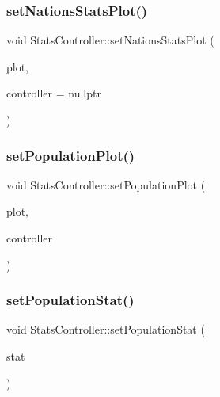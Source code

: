 \mbox{\label{class_stats_controller_ad58717c9b4d91e5c61039ad6fe9a03e8}} 
\subsubsection{\texorpdfstring{setNationsStatsPlot()}{setNationsStatsPlot()}}
{\footnotesize\ttfamily void Stats\+Controller\+::set\+Nations\+Stats\+Plot (\begin{DoxyParamCaption}\item[{\mbox{\hyperlink{class_plot_widget}{Plot\+Widget}} $\ast$}]{plot,  }\item[{\mbox{\hyperlink{class_graph_interaction_controller}{Graph\+Interaction\+Controller}} $\ast$}]{controller = {\ttfamily nullptr} }\end{DoxyParamCaption})}

\mbox{\label{class_stats_controller_af934ef78656ffb0a9068b0983bba30c7}} 
\subsubsection{\texorpdfstring{setPopulationPlot()}{setPopulationPlot()}}
{\footnotesize\ttfamily void Stats\+Controller\+::set\+Population\+Plot (\begin{DoxyParamCaption}\item[{\mbox{\hyperlink{class_plot_widget}{Plot\+Widget}} $\ast$}]{plot,  }\item[{\mbox{\hyperlink{class_graph_interaction_controller}{Graph\+Interaction\+Controller}} $\ast$}]{controller }\end{DoxyParamCaption})}

\mbox{\label{class_stats_controller_a709b2b11f58b038a2f04796f6773ab3d}} 
\subsubsection{\texorpdfstring{setPopulationStat()}{setPopulationStat()}}
{\footnotesize\ttfamily void Stats\+Controller\+::set\+Population\+Stat (\begin{DoxyParamCaption}\item[{\mbox{\hyperlink{namespacedisplace_1_1plot_a523612c6239ff69acc3e5b7c5b40b618}{displace\+::plot\+::\+Population\+Stat}}}]{stat }\end{DoxyParamCaption})}

